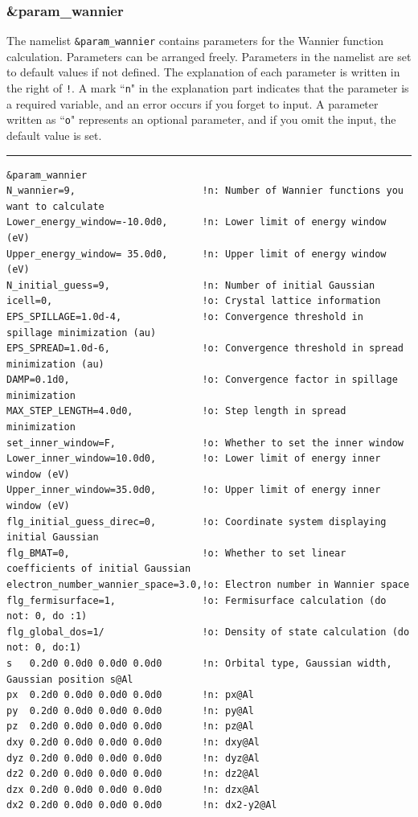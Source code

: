 \documentclass{article}
\begin{document}
\subsubsection{\&param\_wannier} 
The namelist \verb+&param_wannier+ contains parameters for the Wannier function  calculation. Parameters can be arranged freely. Parameters in the namelist are set to default values if not defined. The explanation of each parameter is written in the right of \verb+!+. A mark ``\verb+n+" in the explanation part indicates that the parameter is a required variable, and an error occurs if you forget to input. A parameter written as ``\verb+o+" represents an optional parameter, and if you omit the input, the default value is set.
\vspace{3mm}\hrule
\begin{verbatim}
&param_wannier 
N_wannier=9,                      !n: Number of Wannier functions you want to calculate
Lower_energy_window=-10.0d0,      !n: Lower limit of energy window (eV)
Upper_energy_window= 35.0d0,      !n: Upper limit of energy window (eV)
N_initial_guess=9,                !n: Number of initial Gaussian
icell=0,                          !o: Crystal lattice information
EPS_SPILLAGE=1.0d-4,              !o: Convergence threshold in spillage minimization (au)
EPS_SPREAD=1.0d-6,                !o: Convergence threshold in spread minimization (au)
DAMP=0.1d0,                       !o: Convergence factor in spillage minimization
MAX_STEP_LENGTH=4.0d0,            !o: Step length in spread minimization
set_inner_window=F,               !o: Whether to set the inner window
Lower_inner_window=10.0d0,        !o: Lower limit of energy inner window (eV)
Upper_inner_window=35.0d0,        !o: Upper limit of energy inner window (eV)
flg_initial_guess_direc=0,        !o: Coordinate system displaying initial Gaussian 
flg_BMAT=0,                       !o: Whether to set linear coefficients of initial Gaussian
electron_number_wannier_space=3.0,!o: Electron number in Wannier space 
flg_fermisurface=1,               !o: Fermisurface calculation (do not: 0, do :1)
flg_global_dos=1/                 !o: Density of state calculation (do not: 0, do:1)
s   0.2d0 0.0d0 0.0d0 0.0d0       !n: Orbital type, Gaussian width, Gaussian position s@Al
px  0.2d0 0.0d0 0.0d0 0.0d0       !n: px@Al
py  0.2d0 0.0d0 0.0d0 0.0d0       !n: py@Al
pz  0.2d0 0.0d0 0.0d0 0.0d0       !n: pz@Al
dxy 0.2d0 0.0d0 0.0d0 0.0d0       !n: dxy@Al
dyz 0.2d0 0.0d0 0.0d0 0.0d0       !n: dyz@Al
dz2 0.2d0 0.0d0 0.0d0 0.0d0       !n: dz2@Al
dzx 0.2d0 0.0d0 0.0d0 0.0d0       !n: dzx@Al
dx2 0.2d0 0.0d0 0.0d0 0.0d0       !n: dx2-y2@Al
\end{verbatim}
\end{document}
